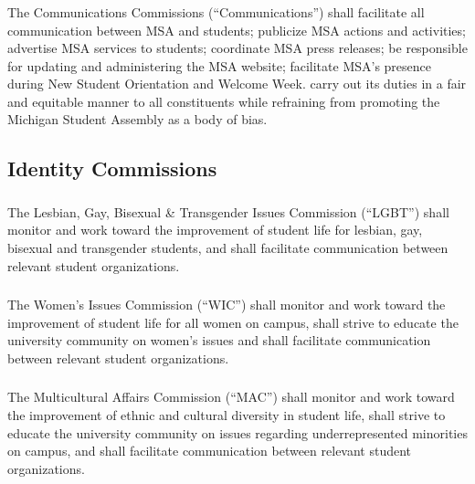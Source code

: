 \subsubsection{}
The Communications Commissions (``Communications'') shall
\subsubsubsection{}
facilitate all communication between MSA and students;
\subsubsubsection{}
publicize MSA actions and activities;
\subsubsubsection{}
advertise MSA services to students;
\subsubsubsection{}
coordinate MSA press releases;
\subsubsubsection{}
be responsible for updating and administering the MSA website;
\subsubsubsection{}
facilitate MSA's presence during New Student Orientation and Welcome Week.
\subsubsubsection{}
carry out its duties in a fair and equitable manner to all constituents while refraining from promoting the Michigan Student Assembly as a body of bias.


\subsection{Identity Commissions}

\subsubsection{}
The Lesbian, Gay, Bisexual \& Transgender Issues Commission (``LGBT'') shall monitor and work toward the improvement of student life for lesbian, gay, bisexual and transgender students, and shall facilitate communication between relevant student organizations.

\subsubsection{}
The Women's Issues Commission (``WIC'') shall monitor and work toward the improvement of student life for all women on campus, shall strive to educate the university community on women's issues and shall facilitate communication between relevant student organizations.

\subsubsection{}
The Multicultural Affairs Commission (``MAC'') shall monitor and work toward the improvement of ethnic and cultural diversity in student life, shall strive to educate the university community on issues regarding underrepresented minorities on campus, and shall facilitate communication between relevant student organizations.

